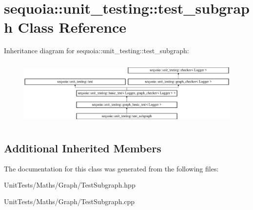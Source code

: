 \hypertarget{classsequoia_1_1unit__testing_1_1test__subgraph}{}\section{sequoia\+::unit\+\_\+testing\+::test\+\_\+subgraph Class Reference}
\label{classsequoia_1_1unit__testing_1_1test__subgraph}
Inheritance diagram for sequoia\+::unit\+\_\+testing\+::test\+\_\+subgraph\+:\begin{figure}[H]
\begin{center}
\leavevmode
\includegraphics[height=3.357314cm]{classsequoia_1_1unit__testing_1_1test__subgraph}
\end{center}
\end{figure}
\subsection*{Additional Inherited Members}


The documentation for this class was generated from the following files\+:\begin{DoxyCompactItemize}
\item 
Unit\+Tests/\+Maths/\+Graph/Test\+Subgraph.\+hpp\item 
Unit\+Tests/\+Maths/\+Graph/Test\+Subgraph.\+cpp\end{DoxyCompactItemize}
